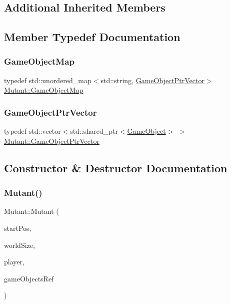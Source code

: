 \subsection*{Additional Inherited Members}


\subsection{Member Typedef Documentation}
\mbox{\label{class_mutant_a21ecadaee40ad4871af74ef606913db1}} 
\subsubsection{\texorpdfstring{Game\+Object\+Map}{GameObjectMap}}
{\footnotesize\ttfamily typedef std\+::unordered\+\_\+map$<$std\+::string, \hyperlink{class_mutant_a3fb0c08b707c995a0af286a938556169}{Game\+Object\+Ptr\+Vector}$>$ \hyperlink{class_mutant_a21ecadaee40ad4871af74ef606913db1}{Mutant\+::\+Game\+Object\+Map}}

\mbox{\label{class_mutant_a3fb0c08b707c995a0af286a938556169}} 
\subsubsection{\texorpdfstring{Game\+Object\+Ptr\+Vector}{GameObjectPtrVector}}
{\footnotesize\ttfamily typedef std\+::vector$<$std\+::shared\+\_\+ptr$<$\hyperlink{class_game_object}{Game\+Object}$>$ $>$ \hyperlink{class_mutant_a3fb0c08b707c995a0af286a938556169}{Mutant\+::\+Game\+Object\+Ptr\+Vector}}



\subsection{Constructor \& Destructor Documentation}
\mbox{\label{class_mutant_ae11d8a5d375b8b469a1125c5f3db059d}} 
\subsubsection{\texorpdfstring{Mutant()}{Mutant()}}
{\footnotesize\ttfamily Mutant\+::\+Mutant (\begin{DoxyParamCaption}\item[{const sf\+::\+Vector2f \&}]{start\+Pos,  }\item[{const sf\+::\+Vector2f \&}]{world\+Size,  }\item[{std\+::shared\+\_\+ptr$<$ \hyperlink{class_game_object}{Game\+Object} $>$}]{player,  }\item[{\hyperlink{class_mutant_a21ecadaee40ad4871af74ef606913db1}{Game\+Object\+Map} \&}]{game\+Objects\+Ref }\end{DoxyParamCaption})}

